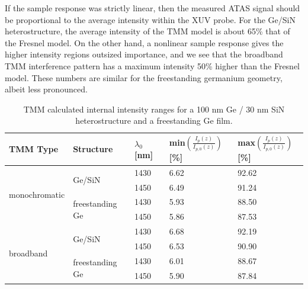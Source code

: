 If the sample response was strictly linear, then the measured ATAS signal should be proportional to the average intensity within the XUV probe. For the Ge/SiN heterostructure, the average intensity of the TMM model is about 65\% that of the Fresnel model. On the other hand, a nonlinear sample response gives the higher intensity regions outsized importance, and we see that the broadband TMM interference pattern has a maximum intensity 50\% higher than the Fresnel model. These numbers are similar for the freestanding germanium geometry, albeit less pronounced.

\begin{table}[]
	\centering
	\begin{tabular}{l|l|l|l|l}
		\textbf{TMM Type} &
		\textbf{Structure} &
		\textbf{$\lambda_0$ {[}nm{]}} &
		\textbf{min$\left(\frac{I_p(z)}{I_{p,0}(z)}\right)$ {[}\%{]}} &
		\textbf{max$\left(\frac{I_p(z)}{I_{p,0}(z)}\right)$ {[}\%{]}} \\ \hline
		\multirow{4}{*}{monochromatic} & \multirow{2}{*}{Ge/SiN}          & 1430 & 6.62 & 92.62 \\
		&                                  & 1450 & 6.49 & 91.24\\ \cline{2-5} 
		& \multirow{2}{*}{freestanding Ge} & 1430 & 5.93 & 88.50 \\
		&                                  & 1450 & 5.86 & 87.53 \\ \hline
		\multirow{4}{*}{broadband}     & \multirow{2}{*}{Ge/SiN}          & 1430 & 6.68 & 92.19 \\
		&                                  & 1450 & 6.53 & 90.90 \\ \cline{2-5} 
		& \multirow{2}{*}{freestanding Ge} & 1430 & 6.01 & 88.67 \\
		&                                  & 1450 & 5.90 & 87.84
	\end{tabular}
	\caption{TMM calculated internal intensity ranges for a 100 nm Ge / 30 nm SiN heterostructure and a freestanding Ge film.}
	\label{tab:TMM_intensity_range}
\end{table}

